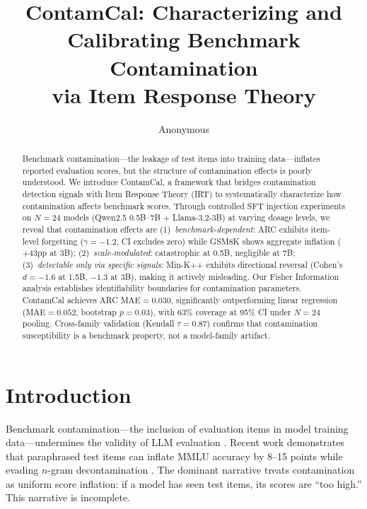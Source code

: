 \documentclass[11pt,a4paper]{article}
\title{ContamCal: Characterizing and Calibrating Benchmark Contamination\\via Item Response Theory}
\author{Anonymous}
\newcommand{\gam}{\gamma}
\begin{document}
\maketitle

\begin{abstract}
Benchmark contamination---the leakage of test items into training data---inflates reported evaluation scores, but the structure of contamination effects is poorly understood. We introduce ContamCal, a framework that bridges contamination detection signals with Item Response Theory (IRT) to systematically characterize how contamination affects benchmark scores. Through controlled SFT injection experiments on $N{=}24$ models (Qwen2.5 0.5B--7B $+$ Llama-3.2-3B) at varying dosage levels, we reveal that contamination effects are (1)~\emph{benchmark-dependent}: ARC exhibits item-level forgetting ($\gam{=}{-}1.2$, CI excludes zero) while GSM8K shows aggregate inflation ($+43$pp at 3B); (2)~\emph{scale-modulated}: catastrophic at 0.5B, negligible at 7B; (3)~\emph{detectable only via specific signals}: Min-K++ exhibits directional reversal (Cohen's $d{=}{-}1.6$ at 1.5B, ${-}1.3$ at 3B), making it actively misleading. Our Fisher Information analysis establishes identifiability boundaries for contamination parameters. ContamCal achieves ARC MAE${=}0.030$, significantly outperforming linear regression (MAE${=}0.052$, bootstrap $p{=}0.03$), with 63\% coverage at 95\% CI under $N{=}24$ pooling. Cross-family validation (Kendall $\tau{=}0.87$) confirms that contamination susceptibility is a benchmark property, not a model-family artifact.
\end{abstract}

\section{Introduction}

Benchmark contamination---the inclusion of evaluation items in model training data---undermines the validity of LLM evaluation \cite{sainz2023nlp,magar2022data}. Recent work demonstrates that paraphrased test items can inflate MMLU accuracy by 8--15 points while evading $n$-gram decontamination \cite{yang2023rethinking,golchin2024time}. The dominant narrative treats contamination as uniform score inflation: if a model has seen test items, its scores are ``too high.'' This narrative is incomplete.
\end{document}
